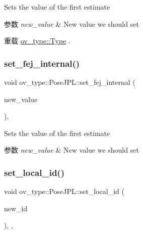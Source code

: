 Sets the value of the first estimate 


\begin{DoxyParams}{参数}
{\em new\+\_\+value} & New value we should set \\
\hline
\end{DoxyParams}


重载 \hyperlink{classov__type_1_1Type_ab8345946b27cb43e0cfc36454a06686d}{ov\+\_\+type\+::\+Type} .

\mbox{\label{classov__type_1_1PoseJPL_a779b5bce92981b57b018ab5c14cf4b99}} 
\subsubsection{\texorpdfstring{set\+\_\+fej\+\_\+internal()}{set\_fej\_internal()}}
{\footnotesize\ttfamily void ov\+\_\+type\+::\+Pose\+J\+P\+L\+::set\+\_\+fej\+\_\+internal (\begin{DoxyParamCaption}\item[{const Eigen\+::\+Matrix\+Xd \&}]{new\+\_\+value }\end{DoxyParamCaption})\hspace{0.3cm}{\ttfamily [inline]}, {\ttfamily [protected]}}



Sets the value of the first estimate 


\begin{DoxyParams}{参数}
{\em new\+\_\+value} & New value we should set \\
\hline
\end{DoxyParams}
\mbox{\label{classov__type_1_1PoseJPL_a2295d3fbdd9529c1464957961a886731}} 
\subsubsection{\texorpdfstring{set\+\_\+local\+\_\+id()}{set\_local\_id()}}
{\footnotesize\ttfamily void ov\+\_\+type\+::\+Pose\+J\+P\+L\+::set\+\_\+local\+\_\+id (\begin{DoxyParamCaption}\item[{int}]{new\+\_\+id }\end{DoxyParamCaption})\hspace{0.3cm}{\ttfamily [inline]}, {\ttfamily [override]}, {\ttfamily [virtual]}}



